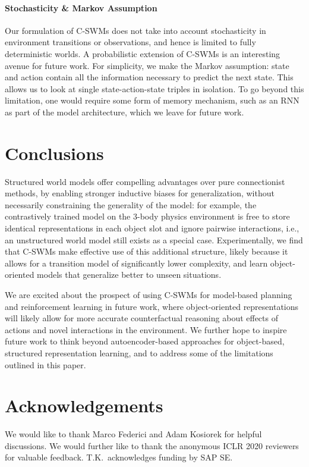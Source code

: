 \documentclass{article} %
\begin{document}
\paragraph{Stochasticity \& Markov Assumption}
Our formulation of C-SWMs does not take into account stochasticity in environment transitions or observations, and hence is limited to fully deterministic worlds. A probabilistic extension of C-SWMs is an interesting avenue for future work.
For simplicity, we make the Markov assumption: state and action contain all the information necessary to predict the next state. This allows us to look at single state-action-state triples in isolation. To go beyond this limitation, one would require some form of memory mechanism, such as an RNN as part of the model architecture, which we leave for future work.

\section{Conclusions}
Structured world models offer compelling advantages over pure connectionist methods, by enabling stronger inductive biases for generalization, without necessarily constraining the generality of the model: for example, the contrastively trained model on the 3-body physics environment is free to store identical representations in each object slot and ignore pairwise interactions, i.e., an unstructured world model still exists as a special case. Experimentally, we find that C-SWMs make effective use of this additional structure, likely because it allows for a transition model of significantly lower complexity, and learn object-oriented models that generalize better to unseen situations.

We are excited about the prospect of using C-SWMs for model-based planning and reinforcement learning in future work, where object-oriented representations will likely allow for more accurate counterfactual reasoning about effects of actions and novel interactions in the environment. We further hope to inspire future work to think beyond autoencoder-based approaches for object-based, structured representation learning, and to address some of the limitations outlined in this paper.

\section*{Acknowledgements}
We would like to thank Marco Federici and Adam Kosiorek
for helpful discussions. We would further like to thank the anonymous ICLR 2020 reviewers for valuable feedback. T.K.~acknowledges funding by SAP SE.
\end{document}
